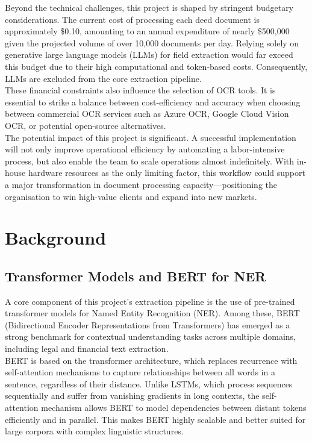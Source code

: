 \documentclass{article}
\begin{document}
Beyond the technical challenges, this project is shaped by stringent budgetary considerations. The current cost of processing each deed document is approximately \$0.10, amounting to an annual expenditure of nearly \$500,000 given the projected volume of over 10,000 documents per day. Relying solely on generative large language models (LLMs) for field extraction would far exceed this budget due to their high computational and token-based costs. Consequently, LLMs are excluded from the core extraction pipeline. \\

These financial constraints also influence the selection of OCR tools. It is essential to strike a balance between cost-efficiency and accuracy when choosing between commercial OCR services such as Azure OCR, Google Cloud Vision OCR, or potential open-source alternatives. \\

The potential impact of this project is significant. A successful implementation will not only improve operational efficiency by automating a labor-intensive process, but also enable the team to scale operations almost indefinitely. With in-house hardware resources as the only limiting factor, this workflow could support a major transformation in document processing capacity—positioning the organisation to win high-value clients and expand into new markets. \\


\section{Background}
\subsection{Transformer Models and BERT for NER}

A core component of this project’s extraction pipeline is the use of pre-trained transformer models for Named Entity Recognition (NER). Among these, BERT (Bidirectional Encoder Representations from Transformers) has emerged as a strong benchmark for contextual understanding tasks across multiple domains, including legal and financial text extraction. \\

BERT is based on the transformer architecture, which replaces recurrence with self-attention mechanisms to capture relationships between all words in a sentence, regardless of their distance. Unlike LSTMs, which process sequences sequentially and suffer from vanishing gradients in long contexts, the self-attention mechanism allows BERT to model dependencies between distant tokens efficiently and in parallel. This makes BERT highly scalable and better suited for large corpora with complex linguistic structures. \\
\end{document}
